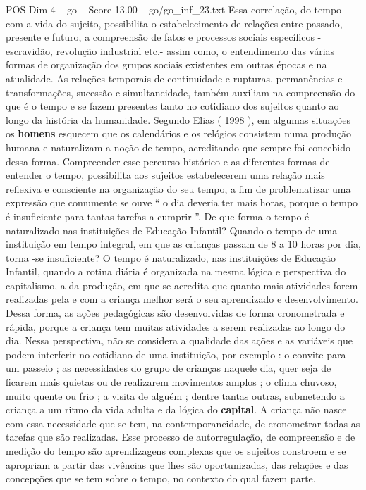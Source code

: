 \begin{textsample}{POS Dim 4 – go – Score 13.00 – go/go\_inf\_23.txt}
Essa correlação, do tempo com a vida do sujeito, possibilita o estabelecimento de relações entre passado, presente e futuro, a compreensão de fatos e processos sociais específicos - escravidão, revolução industrial etc.- assim como, o entendimento das várias formas de organização dos grupos sociais existentes em outras épocas e na atualidade.
As relações temporais de continuidade e rupturas, permanências e transformações, sucessão e simultaneidade, também auxiliam na compreensão do que é o tempo e se fazem presentes tanto no cotidiano dos sujeitos quanto ao longo da história da humanidade.
Segundo Elias ( 1998 ), em algumas situações os \textbf{homens} esquecem que os calendários e os relógios consistem numa produção humana e naturalizam a noção de tempo, acreditando que sempre foi concebido dessa forma.
Compreender esse percurso histórico e as diferentes formas de entender o tempo, possibilita aos sujeitos estabelecerem uma relação mais reflexiva e consciente na organização do seu tempo, a fim de problematizar uma expressão que comumente se ouve “ o dia deveria ter mais horas, porque o tempo é insuficiente para tantas tarefas a cumprir ”.
De que forma o tempo é naturalizado nas instituições de Educação Infantil?
Quando o tempo de uma instituição em tempo integral, em que as crianças passam de 8 a 10 horas por dia, torna -se insuficiente?
O tempo é naturalizado, nas instituições de Educação Infantil, quando a rotina diária é organizada na mesma lógica e perspectiva do capitalismo, a da produção, em que se acredita que quanto mais atividades forem realizadas pela e com a criança melhor será o seu aprendizado e desenvolvimento.
Dessa forma, as ações pedagógicas são desenvolvidas de forma cronometrada e rápida, porque a criança tem muitas atividades a serem realizadas ao longo do dia.
Nessa perspectiva, não se considera a qualidade das ações e as variáveis que podem interferir no cotidiano de uma instituição, por exemplo : o convite para um passeio ; as necessidades do grupo de crianças naquele dia, quer seja de ficarem mais quietas ou de realizarem movimentos amplos ; o clima chuvoso, muito quente ou frio ; a visita de alguém ; dentre tantas outras, submetendo a criança a um ritmo da vida adulta e da lógica do \textbf{capital}.
A criança não nasce com essa necessidade que se tem, na contemporaneidade, de cronometrar todas as tarefas que são realizadas.
Esse processo de autorregulação, de compreensão e de medição do tempo são aprendizagens complexas que os sujeitos constroem e se apropriam a partir das vivências que lhes são oportunizadas, das relações e das concepções que se tem sobre o tempo, no contexto do qual fazem parte.

\end{textsample}
